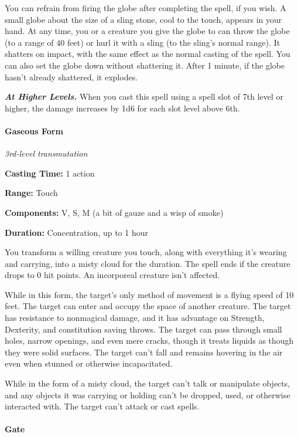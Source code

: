 \documentclass[
]{article}
\begin{document}
You can refrain from firing the globe after completing the spell, if you
wish. A small globe about the size of a sling stone, cool to the touch,
appears in your hand. At any time, you or a creature you give the globe
to can throw the globe (to a range of 40 feet) or hurl it with a sling
(to the sling's normal range). It shatters on impact, with the same
effect as the normal casting of the spell. You can also set the globe
down without shattering it. After 1 minute, if the globe hasn't already
shattered, it explodes.

\emph{\textbf{At Higher Levels.}} When you cast this spell using a spell
slot of 7th level or higher, the damage increases by 1d6 for each slot
level above 6th.

\hypertarget{gaseous-form}{%
\paragraph{Gaseous Form}\label{gaseous-form}}

\emph{3rd-level transmutation}

\textbf{Casting Time:} 1 action

\textbf{Range:} Touch

\textbf{Components:} V, S, M (a bit of gauze and a wisp of smoke)

\textbf{Duration:} Concentration, up to 1 hour

You transform a willing creature you touch, along with everything it's
wearing and carrying, into a misty cloud for the duration. The spell
ends if the creature drops to 0 hit points. An incorporeal creature
isn't affected.

While in this form, the target's only method of movement is a flying
speed of 10 feet. The target can enter and occupy the space of another
creature. The target has resistance to nonmagical damage, and it has
advantage on Strength, Dexterity, and constitution saving throws. The
target can pass through small holes, narrow openings, and even mere
cracks, though it treats liquids as though they were solid surfaces. The
target can't fall and remains hovering in the air even when stunned or
otherwise incapacitated.

While in the form of a misty cloud, the target can't talk or manipulate
objects, and any objects it was carrying or holding can't be dropped,
used, or otherwise interacted with. The target can't attack or cast
spells.

\hypertarget{gate}{%
\paragraph{Gate}\label{gate}}
\end{document}
